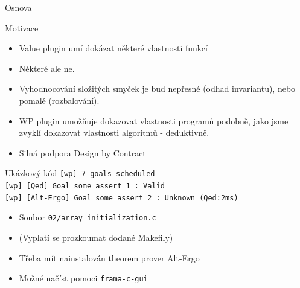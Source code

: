 \documentclass[11pt]{beamer}
\begin{document}
\begin{frame}{Osnova}
\end{frame}

\begin{frame}{Motivace}
	\begin{itemize}
		\item Value plugin umí dokázat některé vlastnosti funkcí
		\pause \item Některé ale ne.
		\item Vyhodnocování složitých smyček je buď nepřesné
			(odhad invariantu), nebo pomalé (rozbalování).
		\item WP plugin umožňuje dokazovat vlastnosti programů podobně, jako jsme zvyklí dokazovat vlastnosti algoritmů - deduktivně.
		\item Silná podpora Design by Contract
	\end{itemize}
\end{frame}



\begin{frame}{Ukázkový kód}
	\lstExIIwpBash
	\texttt{[wp] 7 goals scheduled}\\
	\texttt{[wp] [Qed] Goal some\_assert\_1 : Valid} \\
	\texttt{[wp] [Alt-Ergo] Goal some\_assert\_2 : Unknown (Qed:2ms)}
	\begin{itemize}
		\item Soubor \texttt{02/array\_initialization.c}
		\item (Vyplatí se prozkoumat dodané Makefily)
		\item Třeba mít nainstalován theorem prover Alt-Ergo
		\item Možné načíst pomoci \texttt{frama-c-gui}
	\end{itemize}
\end{frame}

\end{document}
